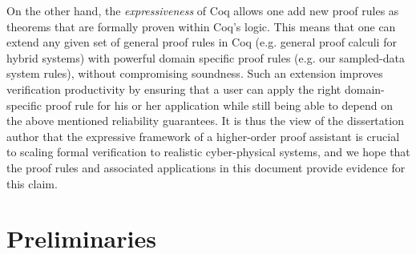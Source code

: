 \documentclass[12pt]{ucsddissertation}
\begin{document}
\begin{dissertationintroduction}
On the other hand, the \emph{expressiveness} of Coq allows one add new
proof rules as theorems that are formally proven within Coq's logic. This
means that one can extend any given set of general proof rules in Coq
(e.g. general proof calculi for hybrid systems) with powerful domain
specific proof rules (e.g. our sampled-data system rules), without
compromising soundness. Such an extension improves verification
productivity by ensuring that a user can apply the right domain-specific
proof rule for his or her application while still being able to depend on
the above mentioned reliability guarantees. It is thus the view of the
dissertation author that the expressive framework of a higher-order proof
assistant is crucial to scaling formal verification to realistic
cyber-physical systems, and we hope that the proof rules and associated
applications in this document provide evidence for this claim.

\end{dissertationintroduction}

\chapter{Preliminaries}
\label{chap:prelim}


\chapter{}
\label{chap:memo15}


\chapter{}
\label{chap:emsoft16}


\chapter{}
\label{chap:exp-smpl}


\backmatter

\end{document}
